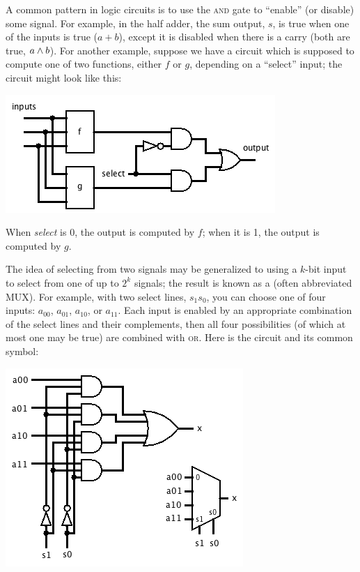 A common pattern in logic circuits is to use the \textsc{and} gate to ``enable'' (or disable) some signal. For example, in the half adder, the sum output, $s$, is true when one of the inputs is true ($a+b$), except it is disabled when there is a carry (both are true, $a\wedge b$). For another example, suppose we have a circuit which is supposed to compute one of two functions, either $f$ or $g$, depending on a ``select'' input; the circuit might look like this:
\begin{center}
\includegraphics[width=!,height=!,scale=0.75]{graphics/ForG.png}
\end{center}
When \textit{select} is 0, the output is computed by $f$; when it is 1, the output is computed by $g$.

The idea of selecting from two signals may be generalized to using a $k$-bit input to select from one of up to $2^k$ signals; the result is known as a  (often abbreviated MUX). For example, with two select lines, $s_1s_0$, you can choose one of four inputs: $a_{00}$, $a_{01}$, $a_{10}$, or $a_{11}$. Each input is enabled by an appropriate combination of the select lines and their complements, then all four possibilities (of which at most one may be true) are combined with \textsc{or}. Here is the circuit and its common symbol:
\begin{center}
\includegraphics[width=!,height=!,scale=0.75]{graphics/MUX.png}
\end{center}

